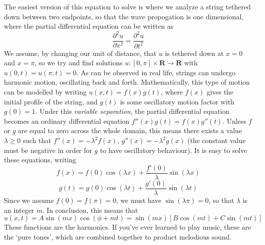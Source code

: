 The easiest version of this equation to solve is where we analyze a string tethered down between two endpoints, so that the wave propogation is one dimensional, where the partial differential equation can be written as
%
\[ \frac{\partial^2 u}{\partial x^2} = \frac{\partial^2 u}{\partial t^2} \]
%
We assume, by changing our unit of distance, that $u$ is tethered down at $x = 0$ and $x = \pi$, so we try and find solutions $u: [0,\pi] \times \mathbf{R} \to \mathbf{R}$ with $u(0,t) = u(\pi,t) = 0$. As can be observed  in real life, strings can undergo harmonic motion, oscillating back and forth. Mathematically, this type of motion can be modelled by writing $u(x,t) = f(x) g(t)$, where $f(x)$ gives the initial profile of the string, and $g(t)$ is some oscillatory motion factor with $g(0) = 1$. Under this {\it variable separation}, the partial differential equation becomes an ordinary differential equation $f''(x) g(t) = f(x) g''(t)$. Unless $f$ or $g$ are equal to zero across the whole domain, this means there exists a value $\lambda \geq 0$ such that $f''(x) = - \lambda^2 f(x)$, $g''(x) = - \lambda^2 g(x)$ (the constant value must be negative in order for $g$ to have oscillatory behaviour). It is easy to solve these equations, writing
%
\[ f(x) = f(0) \cos(\lambda x) + \frac{f'(0)}{\lambda} \sin(\lambda x) \]
\[ g(t) = g(0) \cos(\lambda t) + \frac{g'(0)}{\lambda} \sin(\lambda t) \]
%
Since we assume $f(0) = f(\pi) = 0$, we must have $\sin(\lambda \pi) = 0$, so that $\lambda$ is an integer $m$. In conclusion, this means that
%
\[ u(x,t) = A \sin(mx) \cos(\phi + mt) = \sin(mx)[B \cos(mt) + C \sin(mt)] \]
%
These functions are the harmonics. If you've ever learned to play music, these are the `pure tones', which are combined together to product melodious sound.


